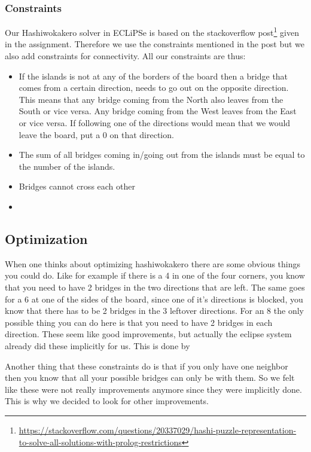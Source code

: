 \documentclass{report}
\begin{document}
\subsubsection{Constraints}
Our Hashiwokakero solver in ECLiPSe is based on the stackoverflow post\footnote{\url{https://stackoverflow.com/questions/20337029/hashi-puzzle-representation-to-solve-all-solutions-with-prolog-restrictions}} given in the assignment. Therefore we use the constraints mentioned in the post but we also add constraints for connectivity. All our constraints are thus:

\begin{itemize}
	\item If the islands is not at any of the borders of the board then a bridge that comes from a certain direction, needs to go out on the opposite direction. This means that any bridge coming from the North also leaves from the South or vice versa. Any bridge coming from the West leaves from the East or vice versa. If following one of the directions would mean that we would leave the board, put a 0 on that direction.
	\item The sum of all bridges coming in/going out from the islands must be equal to the number of the islands.
	\item Bridges cannot cross each other
	\item 
	
\end{itemize}
\subsection{Optimization}
When one thinks about optimizing hashiwokakero there are some obvious things you could do. Like for example if there is a 4 in one of the four corners, you know that you need to have 2 bridges in the two directions that are left. The same goes for a 6 at one of the sides of the board, since one of it's directions is blocked, you know that there has to be 2 bridges in the 3 leftover directions. For an 8 the only possible thing you can do here is that you need to have 2 bridges in each direction. These seem like good improvements, but actually the eclipse system already did these implicitly for us. This is done by
\newline

Another thing that these constraints do is that if you only have one neighbor then you know that all your possible bridges can only be with them. So we felt like these were not really improvements anymore since they were implicitly done. This is why we decided to look for other improvements.
\end{document}
